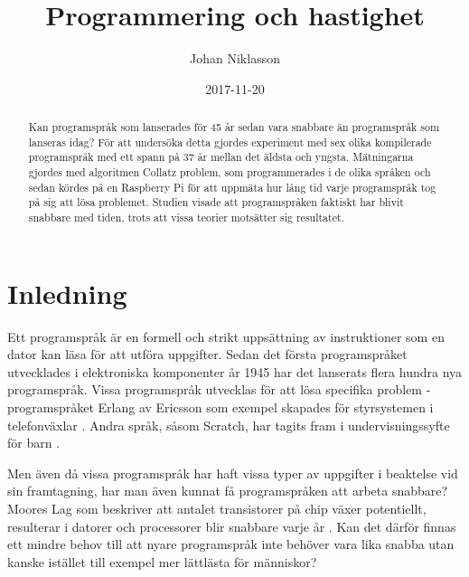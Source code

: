 \documentclass[12pt,swedish]{article}
\title{Programmering och hastighet}
\author{Johan Niklasson}
\date{2017-11-20}
\begin{document}

\maketitle
\normalsize
\begin{center}

\begin{abstract}
Kan programspråk som lanserades för 45 år sedan vara snabbare än programspråk som lanseras idag? För att undersöka detta gjordes experiment med sex olika kompilerade programspråk med ett spann på 37 år mellan det äldsta och yngsta. Mätningarna gjordes med algoritmen Collatz problem, som programmerades i de olika språken och sedan kördes på en Raspberry Pi för att uppmäta hur lång tid varje programspråk tog på sig att lösa problemet. Studien visade att programspråken faktiskt har blivit snabbare med tiden, trots att vissa teorier motsätter sig resultatet.
\end{abstract}
\end{center}
\clearpage


\tableofcontents
\clearpage


\section{Inledning}
Ett programspråk är en formell och strikt uppsättning av instruktioner som en dator kan läsa för att utföra uppgifter. Sedan det första programspråket utvecklades i elektroniska komponenter år 1945 \citep{bauer_wossner_1972} har det lanserats flera hundra nya programspråk. Vissa programspråk utvecklas för att lösa specifika problem - programspråket Erlang av Ericsson som exempel skapades för styrsystemen i telefonväxlar \citep{armstrong_1997}. Andra språk, såsom Scratch, har tagits fram i undervisningssyfte för barn \citep{maloney_resnick_rusk_silverman_eastmond_2010}.

Men även då vissa programspråk har haft vissa typer av uppgifter i beaktelse vid sin framtagning, har man även kunnat få programspråken att arbeta snabbare? Moores Lag som beskriver att antalet transistorer på chip växer potentiellt, resulterar i datorer och processorer blir snabbare varje år \citep{schaller_1997}. Kan det därför finnas ett mindre behov till att nyare programspråk inte behöver vara lika snabba utan kanske istället till exempel mer lättlästa för människor?
\end{document}
